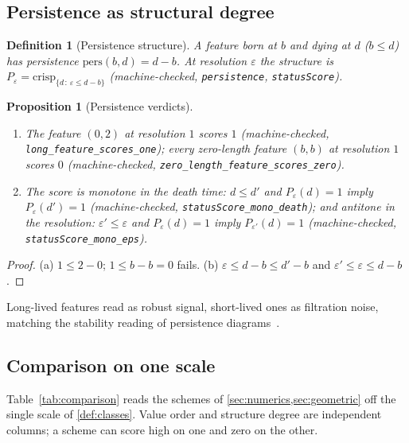 \documentclass[11pt,a4paper]{article}
\newtheorem{proposition}[theorem]{Proposition}
\newtheorem{definition}[theorem]{Definition}
\begin{document}
\subsection{Persistence as structural degree}

\begin{definition}[Persistence structure]
\label{def:persistence}
A feature born at $b$ and dying at $d$ ($b \le d$) has
\emph{persistence} $\mathrm{pers}(b,d) = d - b$.
At resolution $\varepsilon$ the structure is
$P_\varepsilon = \mathrm{crisp}_{\{d \,:\, \varepsilon \le d - b\}}$
(machine-checked, \texttt{persistence}, \texttt{statusScore}).
\end{definition}

\begin{proposition}[Persistence verdicts]
\label{thm:persistence}
\begin{enumerate}[label=\textup{(\alph*)},nosep]
\item The feature $(0,2)$ at resolution $1$ scores $1$
  (machine-checked, \texttt{long\_feature\_scores\_one});
  every zero-length feature $(b,b)$ at resolution $1$ scores $0$
  (machine-checked, \texttt{zero\_length\_feature\_scores\_zero}).
\item The score is monotone in the death time: $d \le d'$ and
  $P_\varepsilon(d) = 1$ imply $P_\varepsilon(d') = 1$
  (machine-checked, \texttt{statusScore\_mono\_death}); and antitone in
  the resolution: $\varepsilon' \le \varepsilon$ and
  $P_\varepsilon(d) = 1$ imply $P_{\varepsilon'}(d) = 1$
  (machine-checked, \texttt{statusScore\_mono\_eps}).
\end{enumerate}
\end{proposition}
\begin{proof}
(a) $1 \le 2 - 0$; $1 \le b - b = 0$ fails.
(b) $\varepsilon \le d - b \le d' - b$ and
$\varepsilon' \le \varepsilon \le d - b$.
\end{proof}

Long-lived features read as robust signal, short-lived ones as %
filtration noise, matching the stability reading of persistence
diagrams~\cite{edelsbrunner2010}.

\subsection{Comparison on one scale}

Table~\ref{tab:comparison} reads the schemes of
\cref{sec:numerics,sec:geometric} off the single scale of
\cref{def:classes}.
Value order and structure degree are independent columns; a scheme can
score high on one and zero on the other.
\end{document}
